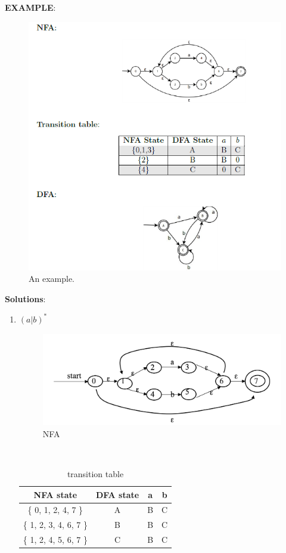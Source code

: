 \documentclass[12pt,a4paper]{article}
\makeatletter
\newtheorem*{solution}{Solution}
\renewenvironment{solution}[1][Solution] {\par\pushQED{\qed}\normalfont\topsep6\p@\@plus6\p@\relax\trivlist\item[\hskip\labelsep\bfseries#1\@addpunct{.}]\ignorespaces}{\popQED\endtrivlist\@endpefalse} \makeatother
\makeatother
\begin{document}
\begin{enumerate}
    \newpage

    \textbf{EXAMPLE}:
    \begin{figure}[h]
    \center
    \includegraphics[width=0.8\linewidth]{Example}\vspace{-10pt}
    \caption{An example.} \label{fig:example}\vspace{-10pt}
    \end{figure}


    \newpage
    \textbf{Solutions}:
    \begin{enumerate}
    \item $(a|b)^*$
    \textrm{\\}
    \begin{figure}[h]
    \center
    \includegraphics[width=0.8\linewidth]{sol4}\vspace{-10pt}
    \caption{NFA} \label{NFA}\vspace{-10pt}
    \end{figure}

    \textrm{\\}
    \begin{table}[h]
    \centering
    \begin{tabular}{|c|c|c|c|}
    \hline
    NFA state & DFA state & a & b\\
    \hline
    \{ 0, 1, 2, 4, 7 \} & A & B & C\\
    \hline
    \{ 1, 2, 3, 4, 6, 7 \} & B & B & C\\
    \hline
    \{ 1, 2, 4, 5, 6, 7 \} & C & B & C\\
    \hline
    \end{tabular}
    \caption{transition table}
    \end{table}


\end{enumerate}
\end{enumerate}
\end{document}
